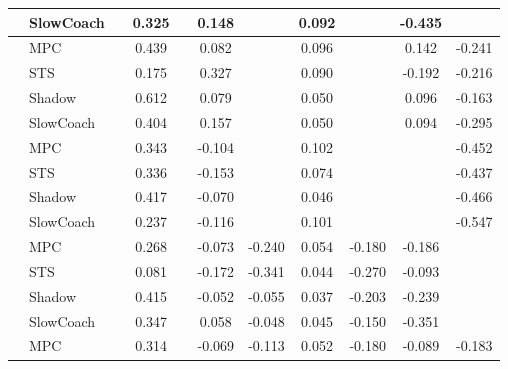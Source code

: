 \begin{tabular}{|l|l|*{9}{c|}}
                                                           & SlowCoach &       &     0.325 &        &  0.148 &     &  0.092 &      &  -0.435 &       \\
\midrule
[False, True, False, True, False, True, False, True, True] & MPC &       &     0.439 &        &  0.082 &     &  0.096 &      &   0.142 &   -0.241 \\
                                                           & STS &       &     0.175 &        &  0.327 &     &  0.090 &      &  -0.192 &   -0.216 \\
                                                           & Shadow &       &     0.612 &        &  0.079 &     &  0.050 &      &   0.096 &   -0.163 \\
                                                           & SlowCoach &       &     0.404 &        &  0.157 &     &  0.050 &      &   0.094 &   -0.295 \\
\midrule
[False, True, False, True, False, True, False, False, True] & MPC &       &     0.343 &        & -0.104 &     &  0.102 &      &      &   -0.452 \\
                                                           & STS &       &     0.336 &        & -0.153 &     &  0.074 &      &      &   -0.437 \\
                                                           & Shadow &       &     0.417 &        & -0.070 &     &  0.046 &      &      &   -0.466 \\
                                                           & SlowCoach &       &     0.237 &        & -0.116 &     &  0.101 &      &      &   -0.547 \\
\midrule
[False, True, False, True, True, True, True, True, False] & MPC &       &     0.268 &        & -0.073 & -0.240 &  0.054 &  -0.180 &  -0.186 &       \\
                                                           & STS &       &     0.081 &        & -0.172 & -0.341 &  0.044 &  -0.270 &  -0.093 &       \\
                                                           & Shadow &       &     0.415 &        & -0.052 & -0.055 &  0.037 &  -0.203 &  -0.239 &       \\
                                                           & SlowCoach &       &     0.347 &        &  0.058 & -0.048 &  0.045 &  -0.150 &  -0.351 &       \\
\midrule
[False, True, False, True, True, True, True, True, True] & MPC &       &     0.314 &        & -0.069 & -0.113 &  0.052 &  -0.180 &  -0.089 &   -0.183 \\

\end{tabular}
